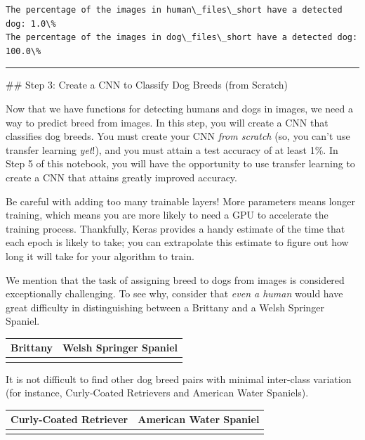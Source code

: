 \documentclass[11pt]{article}
\begin{document}
    \begin{Verbatim}[commandchars=\\\{\}]
The percentage of the images in human\_files\_short have a detected dog: 1.0\%
The percentage of the images in dog\_files\_short have a detected dog: 100.0\%

    \end{Verbatim}

    \begin{center}\rule{0.5\linewidth}{\linethickness}\end{center}

 \#\# Step 3: Create a CNN to Classify Dog Breeds (from Scratch)

Now that we have functions for detecting humans and dogs in images, we
need a way to predict breed from images. In this step, you will create a
CNN that classifies dog breeds. You must create your CNN \emph{from
scratch} (so, you can't use transfer learning \emph{yet}!), and you must
attain a test accuracy of at least 1\%. In Step 5 of this notebook, you
will have the opportunity to use transfer learning to create a CNN that
attains greatly improved accuracy.

Be careful with adding too many trainable layers! More parameters means
longer training, which means you are more likely to need a GPU to
accelerate the training process. Thankfully, Keras provides a handy
estimate of the time that each epoch is likely to take; you can
extrapolate this estimate to figure out how long it will take for your
algorithm to train.

We mention that the task of assigning breed to dogs from images is
considered exceptionally challenging. To see why, consider that
\emph{even a human} would have great difficulty in distinguishing
between a Brittany and a Welsh Springer Spaniel.

\begin{longtable}[]{@{}ll@{}}
\toprule
Brittany & Welsh Springer Spaniel\tabularnewline
\midrule
\endhead
&\tabularnewline
\bottomrule
\end{longtable}

It is not difficult to find other dog breed pairs with minimal
inter-class variation (for instance, Curly-Coated Retrievers and
American Water Spaniels).

\begin{longtable}[]{@{}ll@{}}
\toprule
Curly-Coated Retriever & American Water Spaniel\tabularnewline
\midrule
\endhead
&\tabularnewline
\bottomrule
\end{longtable}
\end{document}
